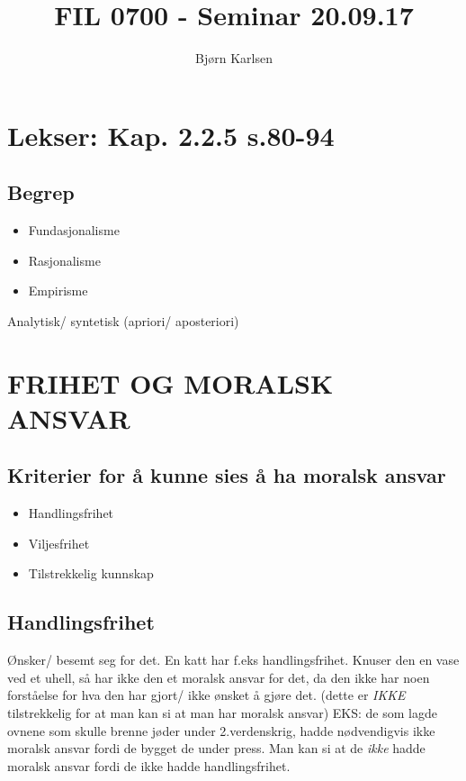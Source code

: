 \documentclass[11pt]{article}
\title{\textbf{FIL 0700 - Seminar 20.09.17}}
\author{Bjørn Karlsen}
\date{}
\begin{document}
\maketitle

\section{Lekser: Kap. 2.2.5 s.80-94}

\subsection{Begrep}
\begin{itemize}
\item{Fundasjonalisme}
\item{Rasjonalisme}
\item{Empirisme}
\end{itemize}

Analytisk/ syntetisk (apriori/ aposteriori)

\section{FRIHET OG MORALSK ANSVAR}

\subsection{Kriterier for å kunne sies å ha moralsk ansvar}
\begin{itemize}
\item{Handlingsfrihet}
\item{Viljesfrihet}
\item{Tilstrekkelig kunnskap}
\end{itemize}

\subsection{Handlingsfrihet}
Ønsker/ besemt seg for det.
En katt har f.eks handlingsfrihet. Knuser den en vase ved et uhell, så har ikke den et moralsk ansvar for det, da den ikke har noen forståelse for hva den har gjort/ ikke ønsket å gjøre det.
(dette er \emph{IKKE} tilstrekkelig for at man kan si at man har moralsk ansvar)
EKS: de som lagde ovnene som skulle brenne jøder under 2.verdenskrig, hadde nødvendigvis ikke moralsk ansvar fordi de bygget de under press. Man kan si at de \emph{ikke} hadde moralsk ansvar fordi de ikke hadde handlingsfrihet.
\end{document}
